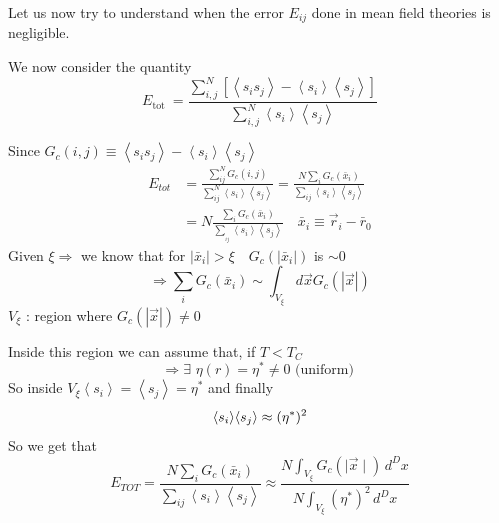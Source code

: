 \documentclass[../../Main/Main.tex]{subfiles}
\begin{document}
Let us now try to understand when the error \( E_{ij} \) done in mean field theories is negligible. 


We now consider the quantity
$$
E_{\text {tot }}=\frac{\sum_{i, j}^N\left[\left\langle s_i s_j\right\rangle-\left\langle s_i\right\rangle\left\langle s_j\right\rangle\right]}{\sum_{i, j}^N\left\langle s_i\right\rangle\left\langle s_j\right\rangle}
$$

Since $G_c(i, j) \equiv\left\langle s_i s_j\right\rangle-\left\langle s_i\right\rangle\left\langle s_j\right\rangle$
$$
\begin{aligned}
E_{t o t} & =\frac{\sum_{i j}^N G_c(i, j)}{\sum_{i j}^N\left\langle s_i\right\rangle\left\langle s_j\right\rangle}=\frac{{N} \sum_i G_c\left(\bar{x}_i\right)}{\sum_{i j}\left\langle s_i\right\rangle\left\langle s_j\right\rangle} \\
& =N \frac{\sum_i G_c\left(\bar{x}_i\right)}{\sum_{_{ij}}\left\langle s_i\right\rangle\left\langle s_j\right\rangle} \quad \bar{x}_i \equiv \vec{r}_i-\bar{r}_0
\end{aligned}
$$
Given $\xi \Rightarrow$ we know that for $\left|\bar{x}_i\right|>\xi \quad G_c\left(\left|\bar{x}_i\right|\right)$ is $\sim 0$
$$
\Rightarrow \sum_i G_c\left(\bar{x}_i\right) \sim \int_{V_{\xi}} d \vec{x} G_c(|\vec{x}|)
$$
$V_\xi$ : region where $G_c(|\vec{x}|) \neq 0$

Inside this region we can assume that, if  $T < T_C$
$$
\Rightarrow \exists\,\, \eta(r)=\eta^* \neq 0 \text { (uniform) }
$$
So inside $V_{\xi}\left\langle s_i\right\rangle=\left\langle s_j\right\rangle=\eta^*$ and finally
$${\left< s_{i} \right>} {\left< s_{j} \right>} \approx (\eta^{*})^{2}$$
So we get that
$$E_{TOT} = \frac{{N} \sum_i G_c\left(\bar{x}_i\right)}{\sum_{i j}\left\langle s_i\right\rangle\left\langle s_j\right\rangle} \approx \frac{N\int _{V_\xi}G_{c}(\mid \vec{x}\mid) \, d^{D}x}{N\int _{V_\xi}(\eta^{*})^{2} \, d^{D}x} $$
\end{document}
